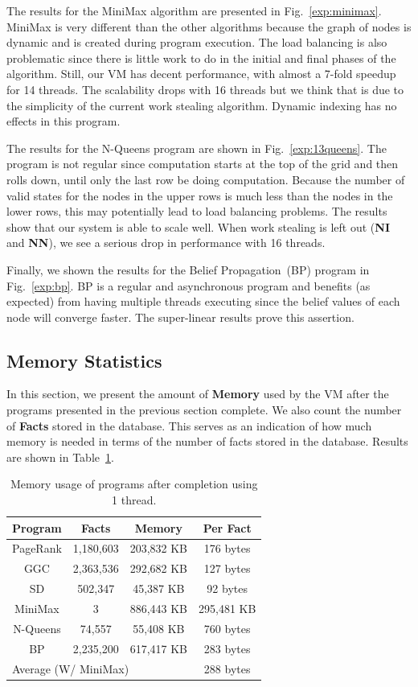 The results for the MiniMax algorithm are presented in Fig.~\ref{exp:minimax}.
MiniMax is very different than the other algorithms because the graph of nodes is dynamic
and is created during program execution. The load balancing is also problematic since there
is little work to do in the initial and final phases of the algorithm. Still, our VM has decent
performance, with almost a 7-fold speedup for 14 threads. The scalability drops with 16 threads
but we think that is due to the simplicity of the current work stealing algorithm.
Dynamic indexing has no effects in this program.

The results for the N-Queens program are shown in
Fig.~\ref{exp:13queens}. The program is not regular since computation
starts at the top of the grid and then rolls down, until only the last
row be doing computation. Because the number of valid states for the
nodes in the upper rows is much less than the nodes in the lower rows,
this may potentially lead to load balancing problems. The results show
that our system is able to scale well. When work stealing is left out
(\textbf{NI} and \textbf{NN}), we see a serious drop in performance with 16 threads.

Finally, we shown the results for the Belief Propagation~(BP) program
in Fig.~\ref{exp:bp}. BP is a regular and asynchronous program and
benefits (as expected) from having multiple threads executing since
the belief values of each node will converge faster.  The super-linear
results prove this assertion.

\subsection{Memory Statistics}

In this section, we present the amount of \textbf{Memory} used by the VM after the
programs presented in the previous section complete. We also count the number of
\textbf{Facts} stored in the database. This serves as an indication of
how much memory is needed in terms of the number of facts stored in the database.
Results are shown in Table~\ref{tbl:memory}.

\begin{table}[ht]
\centering
{\begin{tabular}{c|c|c|c}
\textbf{Program} & \textbf{Facts} & \textbf{Memory} & \textbf{Per Fact} \\
\hline\hline
PageRank & 1,180,603 & 203,832 KB & 176 bytes \\
GGC & 2,363,536 & 292,682 KB & 127 bytes \\
SD & 502,347 & 45,387 KB & 92 bytes \\
MiniMax & 3 & 886,443 KB & 295,481 KB \\
N-Queens & 74,557 & 55,408 KB & 760 bytes \\
BP & 2,235,200 & 617,417 KB & 283 bytes \\
\hline\hline
\multicolumn{3}{l}{Average (W/ MiniMax) } & 288 bytes \\
\end{tabular}}
\caption{Memory usage of programs after completion using 1 thread.}
\label{tbl:memory}
\end{table}


